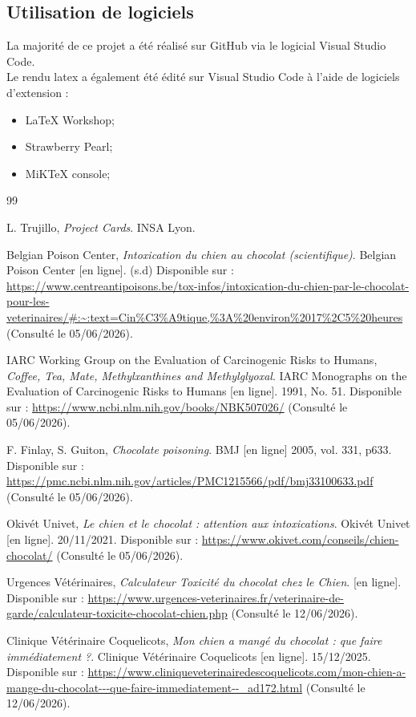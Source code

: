 \documentclass[11pt,a4paper]{article}
\begin{document}
\subsection{Utilisation de logiciels}

La majorité de ce projet a été réalisé sur GitHub via le logicial Visual Studio Code. \\
Le rendu latex a également été édité sur Visual Studio Code à l'aide de logiciels d'extension :
\begin{itemize}
    \item LaTeX Workshop;
    \item Strawberry Pearl;
    \item MiKTeX console;
\end{itemize}


\begin{thebibliography}{99}

L. Trujillo,
\textit{Project Cards}.
INSA Lyon.

Belgian Poison Center,
\textit{Intoxication du chien au chocolat (scientifique)}.
Belgian Poison Center [en ligne]. (s.d) Disponible sur : \url{https://www.centreantipoisons.be/tox-infos/intoxication-du-chien-par-le-chocolat-pour-les-veterinaires/#:~:text=Cin%C3%A9tique,%3A%20environ%2017%2C5%20heures} (Consulté le 05/06/2026).

IARC Working Group on the Evaluation of Carcinogenic Risks to Humans,
\textit{Coffee, Tea, Mate, Methylxanthines and Methylglyoxal}.
IARC Monographs on the Evaluation of Carcinogenic Risks to Humans [en ligne]. 1991, No. 51. Disponible sur : \url{https://www.ncbi.nlm.nih.gov/books/NBK507026/} (Consulté le 05/06/2026).

F. Finlay, S. Guiton,
\textit{Chocolate poisoning}.
BMJ [en ligne] 2005, vol. 331, p633. Disponible sur : \url{https://pmc.ncbi.nlm.nih.gov/articles/PMC1215566/pdf/bmj33100633.pdf} (Consulté le 05/06/2026). 

Okivét Univet,
\textit{Le chien et le chocolat : attention aux intoxications}.
Okivét Univet [en ligne]. 20/11/2021. Disponible sur : \url{https://www.okivet.com/conseils/chien-chocolat/} (Consulté le 05/06/2026). 

Urgences Vétérinaires,
\textit{Calculateur Toxicité du chocolat chez le Chien}.
[en ligne]. Disponible sur : \url{https://www.urgences-veterinaires.fr/veterinaire-de-garde/calculateur-toxicite-chocolat-chien.php} (Consulté le 12/06/2026). 

Clinique Vétérinaire Coquelicots,
\textit{Mon chien a mangé du chocolat : que faire immédiatement ?}.
Clinique Vétérinaire Coquelicots [en ligne]. 15/12/2025. Disponible sur : \url{https://www.cliniqueveterinairedescoquelicots.com/mon-chien-a-mange-du-chocolat---que-faire-immediatement--_ad172.html} (Consulté le 12/06/2026). 


\end{thebibliography}
\end{document}
